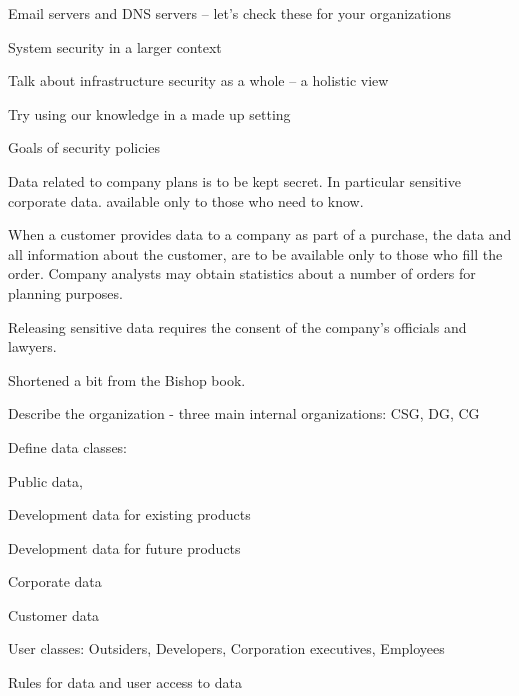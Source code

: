 \documentclass[Screen16to9,17pt]{foils}
\begin{document}
\begin{list2}
\item Email servers and DNS servers -- let's check these for your organizations
\end{list2}




\begin{list2}
\item System security in a larger context
\item Talk about infrastructure security as a whole -- a holistic view
\item Try using our knowledge in a made up setting
\end{list2}




\begin{list2}
\item Goals of security policies
\item Data related to company plans is to be kept secret. In particular sensitive corporate data. available only to those who need to know.
\item When a customer provides data to a company as part of a purchase, the data and all information about the customer, are to be available only to those who fill the order. Company analysts may obtain statistics about a number of orders for planning purposes.
\item Releasing sensitive data requires the consent of the company's officials and lawyers.
\end{list2}

Shortened a bit from the Bishop book.


\begin{list1}
\item Describe the organization - three main internal organizations: CSG, DG, CG
\item Define data classes:
\begin{list2}
\item Public data,
\item Development data for existing products
\item Development data for future products
\item Corporate data
\item Customer data
\end{list2}
\item User classes: Outsiders, Developers, Corporation executives, Employees
\item Rules for data and user access to data
\end{list1}
\end{document}
